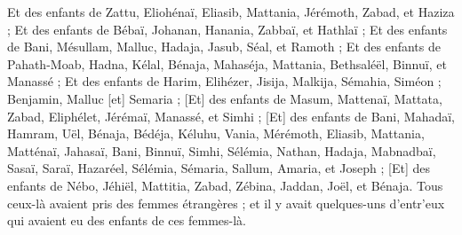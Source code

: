 \begin{multicols}{2}
Et des enfants de Zattu, Eliohénaï, Eliasib, Mattania, Jérémoth, Zabad, et Haziza ;
Et des enfants de Bébaï, Johanan, Hanania, Zabbaï, et Hathlaï ;
Et des enfants de Bani, Mésullam, Malluc, Hadaja, Jasub, Séal, et Ramoth ;
Et des enfants de Pahath-Moab, Hadna, Kélal, Bénaja, Mahaséja, Mattania, Bethsaléël, Binnuï, et Manassé ;
Et des enfants de Harim, Elihézer, Jisija, Malkija, Sémahia, Siméon ;
Benjamin, Malluc [et] Semaria ;
[Et] des enfants de Masum, Mattenaï, Mattata, Zabad, Eliphélet, Jérémaï, Manassé, et Simhi ;
[Et] des enfants de Bani, Mahadaï, Hamram, Uël,
Bénaja, Bédéja, Kéluhu,
Vania, Mérémoth, Eliasib,
Mattania, Matténaï, Jahasaï,
Bani, Binnuï, Simhi,
Sélémia, Nathan, Hadaja,
Mabnadbaï, Sasaï, Saraï,
Hazaréel, Sélémia, Sémaria,
Sallum, Amaria, et Joseph ;
[Et] des enfants de Nébo, Jéhiël, Mattitia, Zabad, Zébina, Jaddan, Joël, et Bénaja.
Tous ceux-là avaient pris des femmes étrangères ; et il y avait quelques-uns d'entr'eux qui avaient eu des enfants de ces femmes-là.
\PPE{}
\end{multicols}
